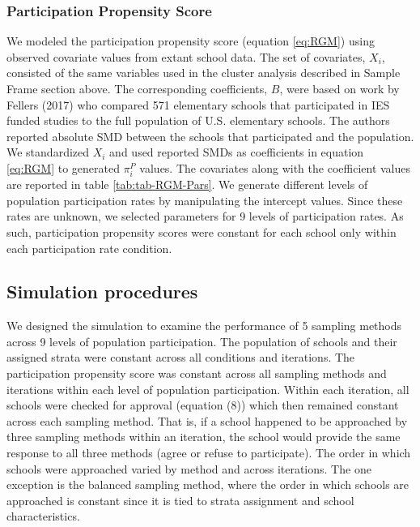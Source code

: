 \documentclass[english,man,floatsintext]{apa6}
\begin{document}
\hypertarget{participation-propensity-score}{%
\subsubsection{Participation Propensity Score}\label{participation-propensity-score}}

We modeled the participation propensity score (equation \eqref{eq:RGM}) using observed covariate values from extant school data. The set of covariates, \(X_i\), consisted of the same variables used in the cluster analysis described in Sample Frame section above. The corresponding coefficients, \(B\), were based on work by Fellers (2017) who compared 571 elementary schools that participated in IES funded studies to the full population of U.S. elementary schools. The authors reported absolute SMD between the schools that participated and the population. We standardized \(X_i\) and used reported SMDs as coefficients in equation \eqref{eq:RGM} to generated \(\pi^P_i\) values. The covariates along with the coefficient values are reported in table \ref{tab:tab-RGM-Pars}. We generate different levels of population participation rates by manipulating the intercept values. Since these rates are unknown, we selected parameters for 9 levels of participation rates. As such, participation propensity scores were constant for each school only within each participation rate condition.

\hypertarget{simulation-procedures}{%
\subsection{Simulation procedures}\label{simulation-procedures}}

We designed the simulation to examine the performance of 5 sampling methods across 9 levels of population participation. The population of schools and their assigned strata were constant across all conditions and iterations. The participation propensity score was constant across all sampling methods and iterations within each level of population participation. Within each iteration, all schools were checked for approval (equation (8)) which then remained constant across each sampling method. That is, if a school happened to be approached by three sampling methods within an iteration, the school would provide the same response to all three methods (agree or refuse to participate). The order in which schools were approached varied by method and across iterations. The one exception is the balanced sampling method, where the order in which schools are approached is constant since it is tied to strata assignment and school characteristics.
\end{document}
